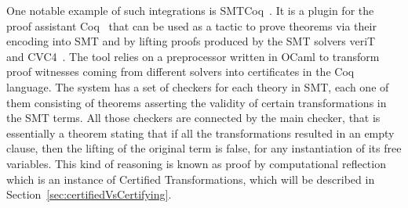 One notable example of such integrations is SMTCoq~\cite{smtcoq}.
It is a plugin for the proof assistant Coq~\cite{Bertot2004} that
can be used as a tactic to prove theorems via their encoding into
SMT and by lifting proofs produced by the SMT solvers veriT~\cite{Bouton2009}
and CVC4~\cite{Barrett2011}. The tool relies on a preprocessor written in OCaml
to transform proof witnesses coming from different solvers into certificates in
the Coq language. The system has a set of checkers for each theory in SMT, each
one of them consisting of theorems asserting the validity of certain transformations
in the SMT terms. All those checkers are connected by the main checker, that
is essentially a theorem stating that if all the transformations resulted in an
empty clause, then the lifting of the original term is false, for any instantiation
of its free variables. This kind of reasoning is known as proof by computational
reflection~\cite{reflection} which is an instance of Certified Transformations, which will be described
in Section~\ref{sec:certifiedVsCertifying}.
